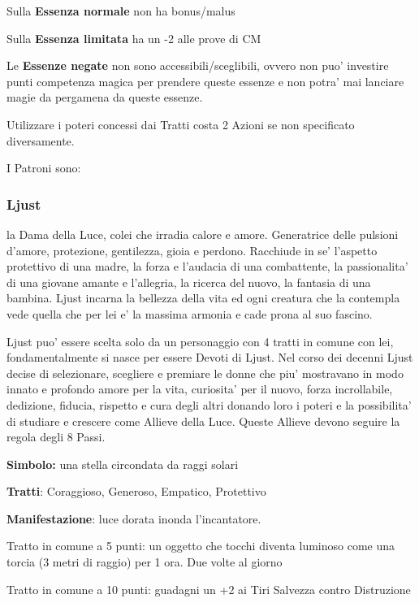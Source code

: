 \documentclass[a4paper,11pt,twoside,openany]{book}
\begin{document}
{Sulla \textbf{Essenza normale} non ha bonus/malus

Sulla \textbf{Essenza limitata} ha un -2 alle prove di CM

Le \textbf{Essenze negate} non sono accessibili/sceglibili, ovvero non puo' investire punti competenza magica per prendere queste essenze e non potra' mai lanciare magie da pergamena da queste essenze.

Utilizzare i poteri concessi dai Tratti costa 2 Azioni se non specificato diversamente.

I Patroni sono:

\subsubsection{Ljust}

\label{ljust}

la Dama della Luce, colei che irradia calore e amore. Generatrice delle pulsioni d'amore, protezione, gentilezza, gioia e perdono. Racchiude in se' l'aspetto protettivo di una madre, la forza e l'audacia di una combattente, la passionalita' di una giovane amante e l'allegria, la ricerca del nuovo, la fantasia di una bambina. Ljust incarna la bellezza della vita ed ogni creatura che la contempla vede quella che per lei e' la massima armonia e cade prona al suo fascino.

Ljust puo' essere scelta solo da un personaggio con 4 tratti in comune con lei, fondamentalmente si nasce per essere Devoti di Ljust. Nel corso dei decenni Ljust decise di selezionare, scegliere e premiare le donne che piu' mostravano in modo innato e profondo amore per la vita, curiosita' per il nuovo, forza incrollabile, dedizione, fiducia, rispetto e cura degli altri donando loro i poteri e la possibilita' di studiare e crescere come Allieve della Luce. Queste Allieve devono seguire la regola degli 8 Passi.

\textbf{Simbolo:} una stella circondata da raggi solari

\textbf{Tratti}: Coraggioso, Generoso, Empatico, Protettivo

\textbf{Manifestazione}: luce dorata inonda l'incantatore.

\bigskip

Tratto in comune a 5 punti: un oggetto che tocchi diventa luminoso come una torcia (3 metri di raggio) per 1 ora. Due volte al giorno

Tratto in comune a 10 punti: guadagni un +2 ai Tiri Salvezza contro Distruzione

}
\end{document}

